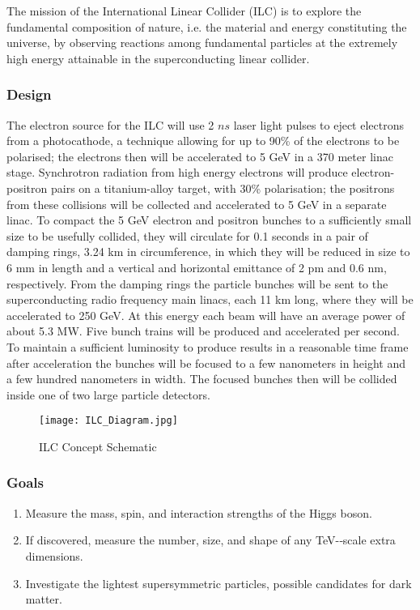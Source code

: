 The mission of the International Linear Collider (ILC) is to explore the fundamental composition of nature, i.e. the material and energy constituting the universe, by observing reactions among fundamental particles at the extremely high energy attainable in the superconducting linear collider.
 
\subsubsection{Design}

The electron source for the ILC will use 2 $ns$ laser light pulses to eject electrons from a photocathode, a technique allowing for up to 90\% of the electrons to be polarised; the electrons then will be accelerated to 5 GeV in a 370 meter linac stage. Synchrotron radiation from high energy electrons will produce electron-positron pairs on a titanium-alloy target, with 30\% polarisation; the positrons from these collisions will be collected and accelerated to 5 GeV in a separate linac.
To compact the 5 GeV electron and positron bunches to a sufficiently small size to be usefully collided, they will circulate for 0.1 seconds in a pair of damping rings, 3.24 km in circumference, in which they will be reduced in size to 6 mm in length and a vertical and horizontal emittance of 2 pm and 0.6 nm, respectively.
From the damping rings the particle bunches will be sent to the superconducting radio frequency main linacs, each 11 km long, where they will be accelerated to 250 GeV. At this energy each beam will have an average power of about 5.3 MW. Five bunch trains will be produced and accelerated per second.
To maintain a sufficient luminosity to produce results in a reasonable time frame after acceleration the bunches will be focused to a few nanometers in height and a few hundred nanometers in width. The focused bunches then will be collided inside one of two large particle detectors.

\begin{figure}[!htb]
\centering
\texttt{[image: ILC\_Diagram.jpg]}
\caption{ILC Concept Schematic \cite{ILC:Images}}
\end{figure}

\subsubsection{Goals \cite{ILC:TechnicalDesignReport}}

\begin{enumerate}
  \item Measure the mass, spin, and interaction strengths of the Higgs boson.
  \item If discovered, measure the number, size, and shape of any TeV-­‐scale extra     dimensions.                                         
  \item Investigate the lightest supersymmetric particles, possible candidates for dark matter.
\end{enumerate}

